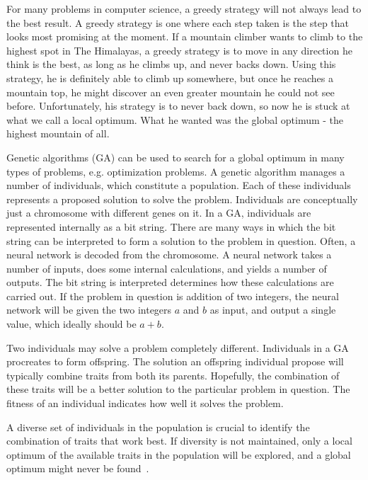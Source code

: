 For many problems in computer science, a greedy strategy will not always lead to the best result.
A greedy strategy is one where each step taken is the step that looks most promising at the moment.
If a mountain climber wants to climb to the highest spot in The Himalayas, a greedy strategy is to move in any direction he think is the best, as long as he climbs up, and never backs down.
Using this strategy, he is definitely able to climb up somewhere, but once he reaches a mountain top, he might discover an even greater mountain he could not see before. Unfortunately, his strategy is to never back down, so now he is stuck at what we call a local optimum. What he wanted was the global optimum - the highest mountain of all.
 
Genetic algorithms (GA) can be used to search for a global optimum in many types of problems, e.g. optimization problems.
A genetic algorithm manages a number of individuals, which constitute a population.
Each of these individuals represents a proposed solution to solve the problem.
Individuals are conceptually just a chromosome with different genes on it.
In a GA, individuals are represented internally as a bit string.
There are many ways in which the bit string can be interpreted to form a solution to the problem in question.
Often, a neural network is decoded from the chromosome. A neural network takes a number of inputs, does some internal calculations, and yields a number of outputs.
The bit string is interpreted determines how these calculations are carried out.
If the problem in question is addition of two integers, the neural network will be given the two integers $a$ and $b$ as input, and output a single value, which ideally should be $a+b$.

Two individuals may solve a problem completely different. 
Individuals in a GA procreates to form offspring.
The solution an offspring individual propose will typically combine traits from both its parents.
Hopefully, the combination of these traits will be a better solution to the particular problem in question.
The fitness of an individual indicates how well it solves the problem.

A diverse set of individuals in the population is crucial to identify the combination of traits that work best. 
If diversity is not maintained, only a local optimum of the available traits in the population will be explored, and a global optimum might never be found~\cite{ursem2002diversity}.

